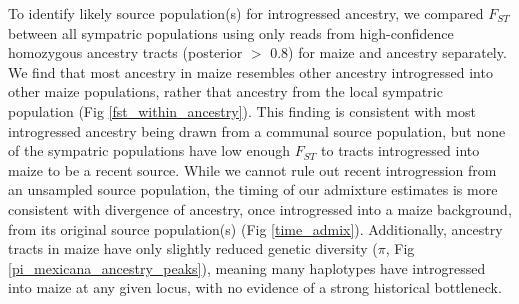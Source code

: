 To identify likely source population(s) for introgressed ancestry, we compared $F_{ST}$ between all sympatric populations using only reads from high-confidence homozygous ancestry tracts (posterior $>$ 0.8) for maize and \mexicana ancestry separately.
We find that most \mexicana ancestry in maize resembles other \mexicana ancestry introgressed into other maize populations, rather that \mexicana ancestry from the local sympatric \mexicana population (Fig \ref{fst_within_ancestry}).
This finding is consistent with most introgressed ancestry being drawn from a communal source population, but none of the sympatric \mexicana populations have low enough $F_{ST}$ to tracts introgressed into maize to be a recent source.
While we cannot rule out recent introgression from an unsampled source population, the timing of our admixture estimates is more consistent with divergence of \mexicana ancestry, once introgressed into a maize background, from its original source population(s) (Fig \ref{time_admix}). Additionally, \mexicana ancestry tracts in maize have only slightly reduced genetic diversity ($\pi$, Fig \ref{pi_mexicana_ancestry_peaks}), meaning many \mexicana haplotypes have introgressed into maize at any given locus, with no evidence of a strong historical bottleneck.

